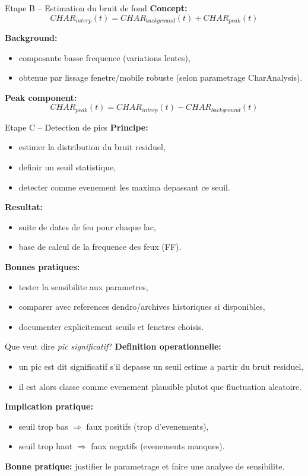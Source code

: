 \documentclass[aspectratio=169,11pt]{beamer}
\begin{document}
\begin{frame}{Etape B -- Estimation du bruit de fond}
\textbf{Concept:}
\[
CHAR_{interp}(t) = CHAR_{background}(t) + CHAR_{peak}(t)
\]

\textbf{Background:}
\begin{itemize}
  \item composante basse frequence (variations lentes),
  \item obtenue par lissage fenetre/mobile robuste (selon parametrage CharAnalysis).
\end{itemize}

\textbf{Peak component:}
\[
CHAR_{peak}(t) = CHAR_{interp}(t) - CHAR_{background}(t)
\]
\end{frame}

\begin{frame}{Etape C -- Detection de pics}
\textbf{Principe:}
\begin{itemize}
  \item estimer la distribution du bruit residuel,
  \item definir un seuil statistique,
  \item detecter comme \alert{evenement} les maxima depassant ce seuil.
\end{itemize}

\textbf{Resultat:}
\begin{itemize}
  \item suite de dates de feu pour chaque lac,
  \item base de calcul de la frequence des feux (FF).
\end{itemize}

\textbf{Bonnes pratiques:}
\begin{itemize}
  \item tester la sensibilite aux parametres,
  \item comparer avec references dendro/archives historiques si disponibles,
  \item documenter explicitement seuils et fenetres choisis.
\end{itemize}
\end{frame}

\begin{frame}{Que veut dire \textit{pic significatif}?}
\textbf{Definition operationnelle:}
\begin{itemize}
  \item un pic est dit significatif s'il depasse un seuil estime a partir du bruit residuel,
  \item il est alors classe comme evenement plausible plutot que fluctuation aleatoire.
\end{itemize}

\textbf{Implication pratique:}
\begin{itemize}
  \item seuil trop bas \(\Rightarrow\) faux positifs (trop d'evenements),
  \item seuil trop haut \(\Rightarrow\) faux negatifs (evenements manques).
\end{itemize}

\textbf{Bonne pratique:} justifier le parametrage et faire une analyse de sensibilite.
\end{frame}
\end{document}
